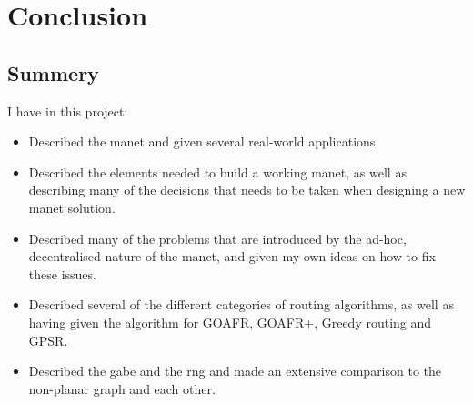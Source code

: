 
\section{Conclusion}
\label{section:conclusion}

\subsection{Summery}

I have in this project:
\begin{itemize}
\item Described the \ac{manet} and given several real-world applications.
\item Described the elements needed to build a working \ac{manet}, as well as describing many of the decisions that needs to be taken when designing a new \ac{manet} solution.
\item Described many of the problems that are introduced by the ad-hoc, decentralised nature of the \ac{manet}, and given my own ideas on how to fix these issues.
\item Described several of the different categories of routing algorithms, as well as having given the algorithm for GOAFR, GOAFR+, Greedy routing and GPSR.
\item Described the \ac{gabe} and the \ac{rng} and made an extensive comparison to the non-planar graph and each other.
\end{itemize}

